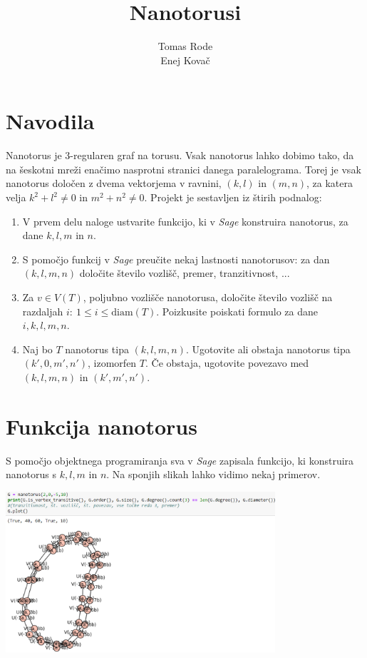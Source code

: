 \documentclass[a4paper, 10 pt, titlepage]{article}
\title{Nanotorusi}
\author{Tomas Rode \\ Enej Kovač}
\begin{document}
\maketitle

\tableofcontents
\pagebreak

\section{Navodila}

Nanotorus je 3-regularen graf na torusu. Vsak nanotorus lahko dobimo tako, da na šeskotni mreži enačimo nasprotni stranici danega paralelograma. Torej je vsak nanotorus določen z dvema vektorjema v ravnini, $(k,l)$ in $(m, n)$, za katera velja $k^2 + l^2 \neq 0$ in $m^2 + n^2 \neq 0$. Projekt je sestavljen iz štirih podnalog:

\begin{enumerate}
  \item V prvem delu naloge ustvarite funkcijo, ki v \textit{Sage} konstruira nanotorus, za dane $k, l, m$ in $n$.
  \item S pomočjo funkcij v \textit{Sage} preučite nekaj lastnosti nanotorusov: za dan $(k, l, m, n)$ določite število vozlišč, premer, tranzitivnost, ...
  \item Za $v \in V(T)$, poljubno vozlišče nanotorusa, določite število vozlišč na razdaljah $i:\ 1 \leq i \leq \textrm{diam}(T)$. Poizkusite poiskati formulo za dane $i, k, l, m, n$.
  \item Naj bo $T$ nanotorus tipa $(k, l, m, n)$. Ugotovite ali obstaja nanotorus tipa $(k', 0, m', n')$, izomorfen $T$. Če obstaja, ugotovite povezavo med $(k, l, m, n)$ in $(k', m', n')$.
\end{enumerate}

\pagebreak

\section{Funkcija nanotorus}

S pomočjo objektnega programiranja sva v \textit{Sage} zapisala funkcijo, ki konstruira nanotorus s $k, l, m$ in $n$. Na sponjih slikah lahko vidimo nekaj primerov.

\begin{center}
\includegraphics[width=10cm]{nano2}
\end{center}
\vspace{1cm}
\end{document}
